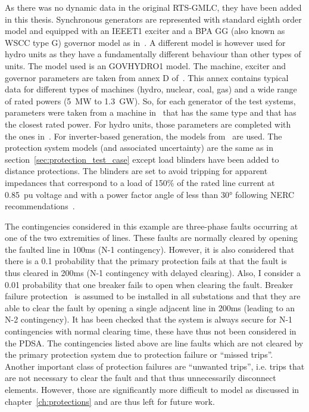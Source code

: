 As there was no dynamic data in the original RTS-GMLC, they have been added in this thesis. Synchronous generators are represented with standard eighth order model and equipped with an IEEET1 exciter and a BPA GG (also known as WSCC type G) governor model as in~\cite{IEEE39Dynamic}. A different model is however used for hydro units as they have a fundamentally different behaviour than other types of units. The model used is an GOVHYDRO1 model. The machine, exciter and governor parameters are taken from annex D of~\cite{vittalBook}. This annex contains typical data for different types of machines (hydro, nuclear, coal, gas) and a wide range of rated powers (5~MW to 1.3~GW). So, for each generator of the test systems, parameters were taken from a machine in~\cite{vittalBook} that has the same type and that has the closest rated power. For hydro units, those parameters are completed with the ones in~\cite{hydroGov}. For inverter-based generation, the models from~\cite{ChaspierreThesis} are used. The protection system models (and associated uncertainty) are the same as in section~\ref{sec:protection_test_case} except load blinders have been added to distance protections. The blinders are set to avoid tripping for apparent impedances that correspond to a load of 150\% of the rated line current at 0.85~pu voltage and with a power factor angle of less than 30° following NERC recommendations~\cite{NERC_load_blinders}.

The contingencies considered in this example are three-phase faults occurring at one of the two extremities of lines. These faults are normally cleared by opening the faulted line in 100ms (N-1 contingency). However, it is also considered that there is a 0.1 probability that the primary protection fails at that the fault is thus cleared in 200ms (N-1 contingency with delayed clearing). Also, I consider a 0.01 probability that one breaker fails to open when clearing the fault. Breaker failure protection~\cite{HorowitzBook} is assumed to be installed in all substations and that they are able to clear the fault by opening a single adjacent line in 200ms (leading to an N-2 contingency). It has been checked that the system is always secure for N-1 contingencies with normal clearing time, these have thus not been considered in the PDSA. The contingencies listed above are line faults which are not cleared by the primary protection system due to protection failure or ``missed trips''. Another important class of protection failures are ``unwanted trips'', i.e. trips that are not necessary to clear the fault and that thus unnecessarily disconnect elements. However, those are significantly more difficult to model as discussed in chapter~\ref{ch:protections} and are thus left for future work.

